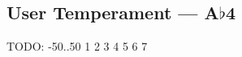 \subsection{User Temperament --- A$\flat$4}









































TODO: -50..50
1
2
3
4
5
6
7
